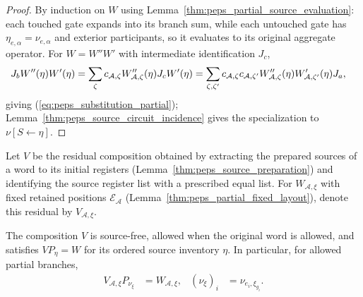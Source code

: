 \begin{proof}
    \leanok
    By induction on $W$ using Lemma~\ref{thm:peps_partial_source_evaluation}:
    each touched gate expands into its branch sum, while each untouched gate has
    $\eta_{e,\alpha}=\nu_{e,\alpha}$ and exterior participants, so it evaluates
    to its original aggregate operator. For $W=W''W'$ with intermediate
    identification $J_c$,
    \begin{align}
        J_bW''(\eta)W'(\eta)
         & =\sum_{\zeta}c_{\mathcal A,\zeta}W''_{\mathcal A,\zeta}(\eta)
        J_cW'(\eta)
        =\sum_{\zeta,\zeta'}c_{\mathcal A,\zeta}c_{\mathcal A,\zeta'}
        W''_{\mathcal A,\zeta}(\eta)W'_{\mathcal A,\zeta'}(\eta)J_a,\notag
    \end{align}
    giving (\ref{eq:peps_substitution_partial}); Lemma~\ref{thm:peps_source_circuit_incidence}
    gives the specialization to $\nu[S\leftarrow\eta]$.
\end{proof}

\begin{definition}
    \label{def:peps_canonical_source_residual}
    \leanok
    Let $V$ be the residual composition obtained by extracting the prepared
    sources of a word to its initial registers
    (Lemma~\ref{thm:peps_source_preparation}) and identifying the source
    register list with a prescribed equal list. For $W_{\mathcal A,\xi}$ with
    fixed retained positions $\mathcal E_{\mathcal A}$
    (Lemma~\ref{thm:peps_partial_fixed_layout}), denote this residual by
    $V_{\mathcal A,\xi}$.
\end{definition}

\begin{lemma}
    \label{thm:peps_canonical_source_recovery}
    \leanok
    The composition $V$ is source-free, allowed when the original word is
    allowed, and satisfies $VP_\eta=W$ for its ordered source inventory $\eta$.
    In particular, for allowed partial branches,
    \begin{align}
        V_{\mathcal A,\xi}P_{\nu_\xi}
         & =W_{\mathcal A,\xi},
         & (\nu_\xi)_i          & =\nu_{e_i,\xi_{g_i}}.
        \label{eq:peps_canonical_recovery}
    \end{align}
\end{lemma}

